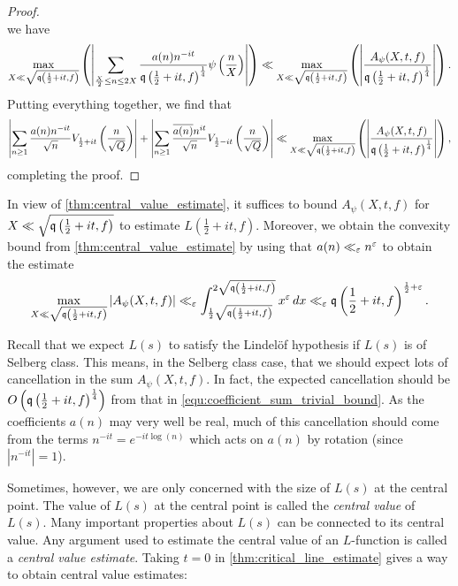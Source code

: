 \documentclass[12pt]{article}
\begin{document}
\begin{proof}
\[      \]
      we have
      \[
        \max_{X \ll \sqrt{\mathfrak{q}\left(\frac{1}{2}+it,f\right)}}\left(\left|\sum_{\frac{X}{2} \le n \le 2X}\frac{a(n)n^{-it}}{\mathfrak{q}\left(\frac{1}{2}+it,f\right)^{\frac{1}{4}}}\psi\left(\frac{n}{X}\right)\right|\right) \ll \max_{X \ll \sqrt{\mathfrak{q}\left(\frac{1}{2}+it,f\right)}}\left(\left|\frac{A_{\psi}(X,t,f)}{\mathfrak{q}\left(\frac{1}{2}+it,f\right)^{\frac{1}{4}}}\right|\right).
      \]
      Putting everything together, we find that
      \[
       \left|\sum_{n \ge 1}\frac{a(n)n^{-it}}{\sqrt{n}}V_{\frac{1}{2}+it}\left(\frac{n}{\sqrt{Q}}\right)\right|+\left|\sum_{n \ge 1}\frac{\overline{a(n)}n^{it}}{\sqrt{n}}V_{\frac{1}{2}-it}\left(\frac{n}{\sqrt{Q}}\right)\right| \ll \max_{X \ll \sqrt{\mathfrak{q}\left(\frac{1}{2}+it,f\right)}}\left(\left|\frac{A_{\psi}(X,t,f)}{\mathfrak{q}\left(\frac{1}{2}+it,f\right)^{\frac{1}{4}}}\right|\right),
      \]
      completing the proof.
    \end{proof}

    In view of \cref{thm:central_value_estimate}, it suffices to bound \(A_{\psi}(X,t,f)\) for \(X \ll \sqrt{\mathfrak{q}\left(\frac{1}{2}+it,f\right)}\) to estimate \(L\left(\frac{1}{2}+it,f\right)\). Moreover, we obtain the convexity bound from \cref{thm:central_value_estimate} by using that \(a(n) \ll_{\varepsilon} n^{\varepsilon}\) to obtain the estimate
    \begin{equation}\label{equ:coefficient_sum_trivial_bound}
      \max_{X \ll \sqrt{\mathfrak{q}\left(\frac{1}{2}+it,f\right)}}|A_{\psi}(X,t,f)| \ll_{\varepsilon} \int_{\frac{1}{2}\sqrt{\mathfrak{q}\left(\frac{1}{2}+it,f\right)}}^{2\sqrt{\mathfrak{q}\left(\frac{1}{2}+it,f\right)}}x^{\varepsilon}\,dx \ll_{\varepsilon} \mathfrak{q}\left(\frac{1}{2}+it,f\right)^{\frac{1}{2}+\varepsilon}.
    \end{equation}
    
    \begin{remark}
      Recall that we expect \(L(s)\) to satisfy the Lindel\"of hypothesis if \(L(s)\) is of Selberg class. This means, in the Selberg class case, that we should expect lots of cancellation in the sum \(A_{\psi}(X,t,f)\). In fact, the expected cancellation should be \(O\left(\mathfrak{q}\left(\frac{1}{2}+it,f\right)^{\frac{1}{4}}\right)\) from that in \cref{equ:coefficient_sum_trivial_bound}. As the coefficients \(a(n)\) may very well be real, much of this cancellation should come from the terms \(n^{-it} = e^{-it\log(n)}\) which acts on \(a(n)\) by rotation (since \(|n^{-it}| = 1\)).
    \end{remark}

    Sometimes, however, we are only concerned with the size of \(L(s)\) at the central point. The value of \(L(s)\) at the central point is called the \textit{central value} of \(L(s)\). Many important properties about \(L(s)\) can be connected to its central value. Any argument used to estimate the central value of an \(L\)-function is called a \textit{central value estimate}. Taking \(t = 0\) in \cref{thm:critical_line_estimate} gives a way to obtain central value estimates:
\end{document}
